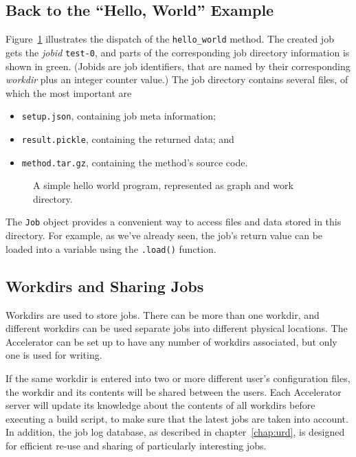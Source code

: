 \subsection{Back to the ``Hello, World'' Example}
Figure~\ref{fig:execflow-hello-world} illustrates the dispatch of the
\texttt{hello\_world} method.  The created job gets the \textsl{jobid}
\texttt{test-0}, and parts of the corresponding job directory
information is shown in green.  (Jobids are job identifiers, that are
named by their corresponding \textsl{workdir} plus an integer counter
value.)  The job directory contains several files, of which the most
important are
\begin{itemize}
\item[] \texttt{setup.json}, containing job meta information;
\item[] \texttt{result.pickle}, containing the returned data; and
\item[] \texttt{method.tar.gz}, containing the method's source code.
\end{itemize}

\begin{figure}[b]
  \begin{center}
    
    \caption{A simple hello world program, represented as graph and
      work directory.}
    \label{fig:execflow-hello-world}
  \end{center}
\end{figure}

The \texttt{Job} object provides a convenient way to access files and
data stored in this directory.  For example, as we've already seen,
the job's return value can be loaded into a variable using the
\texttt{.load()} function.



\subsection{Workdirs and Sharing Jobs}

Workdirs are used to store jobs.  There can be more than one workdir,
and different workdirs can be used separate jobs into different
physical locations.  The Accelerator can be set up to have any number
of workdirs associated, but only one is used for writing.

If the same workdir is entered into two or more different user's
configuration files, the workdir and its contents will be shared
between the users.  Each Accelerator server will update its knowledge
about the contents of all workdirs before executing a build script, to
make sure that the latest jobs are taken into account.  In addition,
the job log database, as described in chapter~\ref{chap:urd}, is
designed for efficient re-use and sharing of particularly interesting
jobs.


